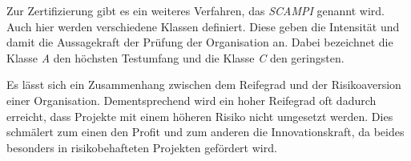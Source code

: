 Zur Zertifizierung gibt es ein weiteres Verfahren, das \textit{SCAMPI} genannt wird. Auch hier werden verschiedene Klassen definiert. Diese geben die Intensität und damit die Aussagekraft der Prüfung der Organisation an. Dabei bezeichnet die Klasse \textit{A} den höchsten Testumfang und die Klasse \textit{C} den geringsten.

Es lässt sich ein Zusammenhang zwischen dem Reifegrad und der Risikoaversion einer Organisation. Dementsprechend wird ein hoher Reifegrad oft dadurch erreicht, dass Projekte mit einem höheren Risiko nicht umgesetzt werden. Dies schmälert zum einen den Profit und zum anderen die Innovationskraft, da beides besonders in risikobehafteten Projekten gefördert wird.